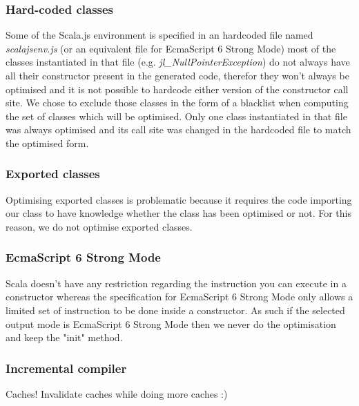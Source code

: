 \subsubsection{Hard-coded classes}
Some of the Scala.js environment is specified in an hardcoded file named
\emph{scalajsenv.js} (or an equivalent file for EcmaScript 6 Strong Mode) most
of the classes instantiated in that file (e.g. \emph{jl\_NullPointerException})
do not always have all their constructor present in the generated code,
therefor they won't always be optimised and it is not possible to hardcode
either version of the constructor call site. We chose to exclude those classes
in the form of a blacklist when computing the set of classes which will be
optimised. Only one class instantiated in that file was always optimised and
its call site was changed in the hardcoded file to match the optimised form.
\subsubsection{Exported classes}
Optimising exported classes is problematic because it requires the code
importing our class to have knowledge whether the class has been optimised or
not. For this reason, we do not optimise exported classes.
\subsubsection{EcmaScript 6 Strong Mode}
Scala doesn't have any restriction regarding the instruction you can execute in
a constructor whereas the specification for EcmaScript 6 Strong Mode only
allows a limited set of instruction to be done inside a constructor. As such if
the selected output mode is EcmaScript 6 Strong Mode then we never do the
optimisation and keep the "init" method.
\subsubsection{Incremental compiler}
Caches! Invalidate caches while doing more caches :)

